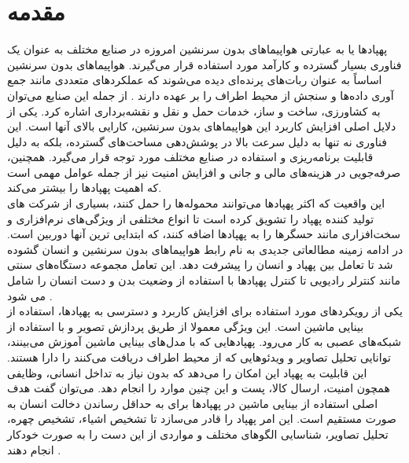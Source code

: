 \chapter{مقدمه}
پهپاد‌ها یا به عبارتی هواپیماهای بدون سرنشین امروزه در صنایع مختلف به عنوان یک فناوری
 ‌بسیار گسترده و کارآمد مورد استفاده قرار می‌گیرند. هواپیماهای بدون سرنشین اساساً به عنوان ربات‌های پرنده‌ای
 دیده می‌شوند که عملکردهای متعددی مانند جمع آوری داده‌ها و سنجش از محیط اطراف را بر عهده دارند \cite{waltergesture}.
 از جمله این صنایع می‌توان به کشاورزی، ساخت و ساز، خدمات حمل و نقل و نقشه‌برداری اشاره کرد. یکی از دلایل
 اصلی افزایش کاربرد این هواپیما‌های بدون سرنشین، کارایی بالای آنها است. این فناوری نه تنها به دلیل سرعت بالا در پوشش‌دهی
 مساحت‌های گسترده، بلکه به دلیل قابلیت برنامه‌ریزی و استفاده در صنایع مختلف مورد توجه قرار می‌گیرد.
 همچنین، صرفه‌جویی در هزینه‌های مالی و جانی و افزایش امنیت نیز از جمله عوامل مهمی است که اهمیت پهپادها را بیشتر می‌کند\cite{puri2017agriculture}.
 \\
 این واقعیت که اکثر پهپادها می‌توانند محموله‌ها را حمل کنند، بسیاری از شرکت های تولید کننده
  پهپاد را تشویق کرده است تا انواع مختلفی از ویژگی‌های نرم‌افزاری و سخت‌افزاری
 مانند حسگرها را به پهپاد‌ها اضافه کنند، که ابتدایی ترین
  آنها دوربین است. در ادامه زمینه مطالعاتی جدیدی به نام رابط هواپیماهای بدون سرنشین و انسان گشوده شد تا تعامل بین پهپاد و 
 انسان را پیشرفت دهد. این تعامل مجموعه‌ دستگاه‌های سنتی مانند کنترلر رادیویی تا کنترل پهپادها با استفاده از وضعیت بدن و دست انسان را شامل می شود \cite{hadri2018hand}.
 \\
 یکی از رویکردهای مورد استفاده برای افزایش کاربرد و دسترسی به پهپادها، استفاده از بینایی ماشین است. این ویژگی معمولا از طریق پردازش تصویر
 و با استفاده از شبکه‌های عصبی به کار می‌رود. پهپاد‌هایی که با مدل‌های بینایی ماشین آموزش می‌بینند، توانایی تحلیل تصاویر و ویدئو‌هایی که از محیط اطراف
 دریافت می‌کنند را دارا هستند. این قابلیت به پهپاد این امکان را می‌دهد که بدون نیاز به تداخل انسانی، وظایفی همچون امنیت، ارسال کالا، پست و این چنین موارد را انجام دهد\cite{zhu2018vision}.
 می‌توان گفت هدف اصلی استفاده از بینایی ماشین در پهپاد‌ها برای به حداقل رساندن دخالت انسان به صورت مستقیم است. این
 امر پهپاد را قادر می‌سازد تا تشخیص اشیاء، تشخیص چهره، تحلیل تصاویر، شناسایی الگوهای مختلف و مواردی از این دست را به صورت خودکار انجام دهند \cite{guvenc2018detection}.


